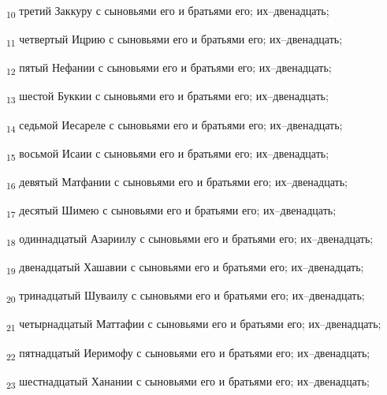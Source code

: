 \begin{tcolorbox}
\textsubscript{10} третий Заккуру с сыновьями его и братьями его; их--двенадцать;
\end{tcolorbox}
\begin{tcolorbox}
\textsubscript{11} четвертый Ицрию с сыновьями его и братьями его; их--двенадцать;
\end{tcolorbox}
\begin{tcolorbox}
\textsubscript{12} пятый Нефании с сыновьями его и братьями его; их--двенадцать;
\end{tcolorbox}
\begin{tcolorbox}
\textsubscript{13} шестой Буккии с сыновьями его и братьями его; их--двенадцать;
\end{tcolorbox}
\begin{tcolorbox}
\textsubscript{14} седьмой Иесареле с сыновьями его и братьями его; их--двенадцать;
\end{tcolorbox}
\begin{tcolorbox}
\textsubscript{15} восьмой Исаии с сыновьями его и братьями его; их--двенадцать;
\end{tcolorbox}
\begin{tcolorbox}
\textsubscript{16} девятый Матфании с сыновьями его и братьями его; их--двенадцать;
\end{tcolorbox}
\begin{tcolorbox}
\textsubscript{17} десятый Шимею с сыновьями его и братьями его; их--двенадцать;
\end{tcolorbox}
\begin{tcolorbox}
\textsubscript{18} одиннадцатый Азариилу с сыновьями его и братьями его; их--двенадцать;
\end{tcolorbox}
\begin{tcolorbox}
\textsubscript{19} двенадцатый Хашавии с сыновьями его и братьями его; их--двенадцать;
\end{tcolorbox}
\begin{tcolorbox}
\textsubscript{20} тринадцатый Шуваилу с сыновьями его и братьями его; их--двенадцать;
\end{tcolorbox}
\begin{tcolorbox}
\textsubscript{21} четырнадцатый Маттафии с сыновьями его и братьями его; их--двенадцать;
\end{tcolorbox}
\begin{tcolorbox}
\textsubscript{22} пятнадцатый Иеримофу с сыновьями его и братьями его; их--двенадцать;
\end{tcolorbox}
\begin{tcolorbox}
\textsubscript{23} шестнадцатый Ханании с сыновьями его и братьями его; их--двенадцать;
\end{tcolorbox}
